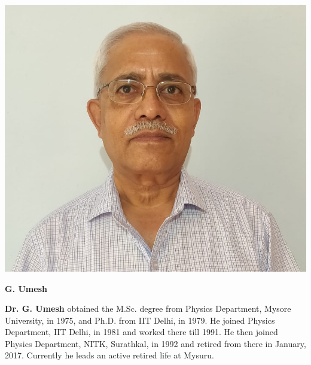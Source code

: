 \centerline{\includegraphics[scale=0.15]{figures/authors/G_Umesh.jpg}}
\smallskip

\centerline{{\large\sf\bf G. Umesh}}
\bigskip

\noindent
{\bf Dr. G. Umesh} obtained the M.Sc. degree from Physics Department, Mysore University, in 1975, and  Ph.D. from IIT Delhi, in 1979. He joined Physics Department, IIT Delhi, in 1981 and worked there till 1991. He then joined Physics Department, NITK, Surathkal, in 1992 and retired from there in January, 2017. Currently he leads an active retired life at Mysuru.
